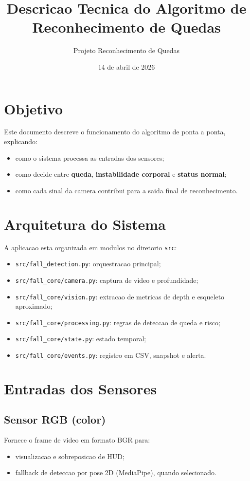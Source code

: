 \documentclass[12pt,a4paper]{article}
\title{Descricao Tecnica do Algoritmo de Reconhecimento de Quedas}
\author{Projeto Reconhecimento de Quedas}
\date{14 de abril de 2026}
\begin{document}
\maketitle

\section{Objetivo}
Este documento descreve o funcionamento do algoritmo de ponta a ponta, explicando:
\begin{itemize}
    \item como o sistema processa as entradas dos sensores;
    \item como decide entre \textbf{queda}, \textbf{instabilidade corporal} e \textbf{status normal};
    \item como cada sinal da camera contribui para a saida final de reconhecimento.
\end{itemize}

\section{Arquitetura do Sistema}
A aplicacao esta organizada em modulos no diretorio \texttt{src}:
\begin{itemize}
    \item \texttt{src/fall\_detection.py}: orquestracao principal;
    \item \texttt{src/fall\_core/camera.py}: captura de video e profundidade;
    \item \texttt{src/fall\_core/vision.py}: extracao de metricas de depth e esqueleto aproximado;
    \item \texttt{src/fall\_core/processing.py}: regras de deteccao de queda e risco;
    \item \texttt{src/fall\_core/state.py}: estado temporal;
    \item \texttt{src/fall\_core/events.py}: registro em CSV, snapshot e alerta.
\end{itemize}

\section{Entradas dos Sensores}
\subsection{Sensor RGB (color)}
Fornece o frame de video em formato BGR para:
\begin{itemize}
    \item visualizacao e sobreposicao de HUD;
    \item fallback de deteccao por pose 2D (MediaPipe), quando selecionado.
\end{itemize}
\end{document}
